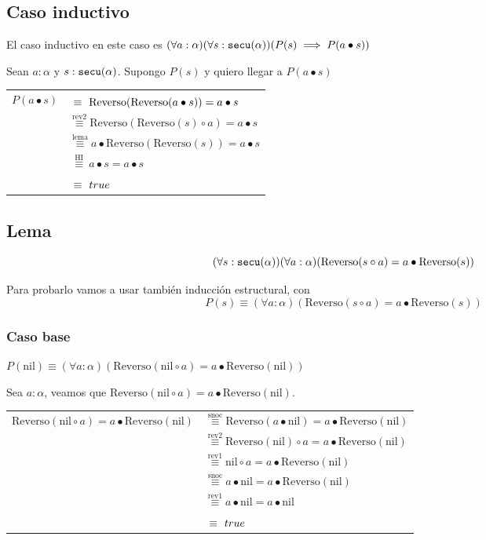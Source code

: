 \documentclass[hidelinks,a4paper,10pt, nofootinbib]{article}
\newcommand{\secu}{\ensuremath\texttt{secu}(\alpha)}
\newcommand{\rev}{\text{Reverso}}
\newcommand{\cons}{\bullet}
\newcommand{\snoc}{\circ}
\newcommand{\nil}{\text{nil}}
\newcommand{\por}[1]{\overset{\text{#1}}{\equiv}}
\newcommand{\ph}{\phantom{rev1}}
\begin{document}
\subsection*{Caso inductivo}
El caso inductivo en este caso es $(\forall a : \alpha) (\forall s : \secu) (P(s) \implies P(a \cons s))$

Sean $a : \alpha$ y $s : \secu$. Supongo $P(s)$ y quiero llegar a $P(a \cons s)$

\begin{center}
\begin{tabular}{c l}
$P(a \cons s)$ & $\por{\ph} \rev(\rev(a \cons s)) = a \cons s$ \\
               & $\por{rev2} \rev(\rev(s) \circ a) = a \cons s$ \\
               & $\por{lema} a \cons \rev(\rev(s)) = a \cons s$ \\
               & $\por{ HI } a \cons s = a \cons s$ \\ 
               & $\por{\ph} true$ \\
\end{tabular}
\end{center}

\subsection*{Lema}

\[(\forall s : \secu) (\forall a : \alpha) (\rev(s \circ a) = a \cons \rev(s))\]

Para probarlo vamos a usar también inducción estructural, con 
\[P(s) \equiv (\forall a : \alpha) (\rev(s \circ a) = a \cons \rev(s))\]

\subsubsection*{Caso base}
$P(\nil) \equiv (\forall a : \alpha) (\rev(\nil \circ a) = a \cons \rev(\nil))$

Sea $ a : \alpha$, veamos que $  \rev(\nil \circ a) = a \cons \rev(\nil)$.

\begin{center}
\begin{tabular}{c l}
$\rev(\nil \circ a) = a \cons \rev(\nil)$ & $\por{snoc} \rev(a \cons \nil) = a \cons \rev(\nil)$ \\
               & $\por{rev2} \rev(\nil) \snoc a = a \cons \rev(\nil)$ \\
               & $\por{rev1} \nil \snoc a = a \cons \rev(\nil)$ \\
               & $\por{snoc} a \cons \nil = a \cons \rev(\nil)$ \\ 
               & $\por{rev1} a \cons \nil = a \cons \nil$ \\ 
               & $\por{\ph} true$ \\
\end{tabular}
\end{center}
\end{document}
